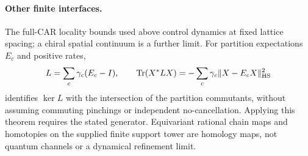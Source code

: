 {}
{}

{}
{}

{}
{}

{}
{}

{}
{}

{}
{}

{}
{}

{}
{}

{}
{}

\paragraph{Other finite interfaces.}
The full-CAR locality bounds used above control dynamics at fixed
lattice spacing; a chiral spatial continuum is a further limit.
For partition expectations $E_c$ and positive rates,
\[
 L=\sum_c\gamma_c(E_c-I),\qquad
 \operatorname{Tr}(X^*LX)=-\sum_c\gamma_c\|X-E_cX\|_{\rm HS}^2
\]
identifies $\ker L$ with the intersection of the partition commutants,
without assuming commuting pinchings or independent no-cancellation.
Applying this theorem requires the stated generator. Equivariant rational
chain maps and homotopies on the supplied finite support tower are homology
maps, not quantum channels or a dynamical refinement limit.

